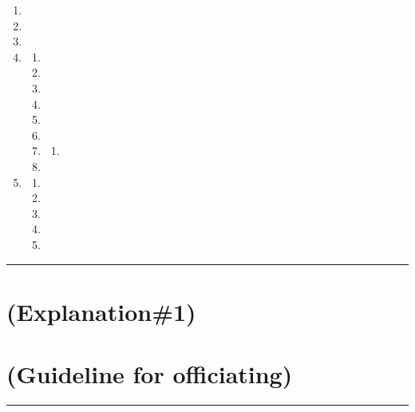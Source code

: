 \documentclass[draft]{report}
\newenvironment{expl}[0]%
  {\rule{\textwidth}{.2pt}\footnotesize}%
  {\rule{\textwidth}{.2pt}\normalsize}
\begin{document}
\begin{enumerate}
\item


\item


\item


\item


  \begin{enumerate}
  \item
  
  \item
  
  \item
  
  \item
  
  \item
  
  \item
  
  \item
  
    \begin{enumerate}
    \item
    
    \end{enumerate}
  \item
  
  \end{enumerate}

\item

  \begin{enumerate}
  \item
  
  \item
  
  \item
  
  \item
  
  \item
  
  \end{enumerate}

\end{enumerate}

\begin{expl}
\section{(Explanation\#1)}


\section{(Guideline for officiating)}

\end{expl}
\end{document}
